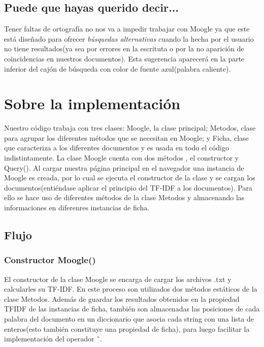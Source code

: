 \documentclass[a4paper,12pt]{article}
\begin{document}
        \subsection{Puede que hayas querido decir...}
            Tener faltas de ortograf\'ia no nos va a impedir trabajar con Moogle ya que este est\'a dise\~nado para ofrecer {\it b\'usquedas alternativas}
            cuando la hecha por el usuario no tiene resultados(ya sea por errores en la escrituta o por la no aparici\'on de coincidencias en nuestros documentos).
            Esta sugerencia aparecer\'a en la parte inferior del caj\'on de b\'usqueda con color de fuente azul(palabra caliente).
    \section{Sobre la implementaci\'on}
        Nuestro c\'odigo trabaja con tres clases: Moogle, la clase principal; Metodos, clase para agrupar los diferentes m\'etodos que se necesitan en Moogle; y Ficha,
         clase que caracteriza a los diferentes documentos y es usada en todo el c\'odigo indistintamente. La clase Moogle cuenta con dos m\'etodos , el constructor y Query().
         Al cargar nuestra p\'agina principal en el navegador una instancia de Moogle es creada, por lo cual se ejecuta el constructor de la clase y se cargan los documentos(enti\'endase
         aplicar el principio del TF-IDF a los documentos). Para ello se hace uso de diferentes m\'etodos de la clase Metodos y almacenando las informaciones en diferenres instancias de ficha.
        \subsection{Flujo}
            \subsubsection{Constructor Moogle()}
                El constructor de la clase Moogle se encarga de cargar los archivos .txt y calcularles su TF-IDF. En este proceso son utilizados dos m\'etodos est\'aticos de la clase Metodos. 
                Adem\'as de guardar los resultados obtenidos en la propiedad TFIDF de las instancias de ficha, tambi\'en son almacenadas las posiciones de cada palabra del documento en un diccionario
                que asocia cada string con una lista de enteros(esto tambi\'en constituye una propiedad de ficha), para luego facilitar la implementaci\'on del operador \~\ .
\end{document}
